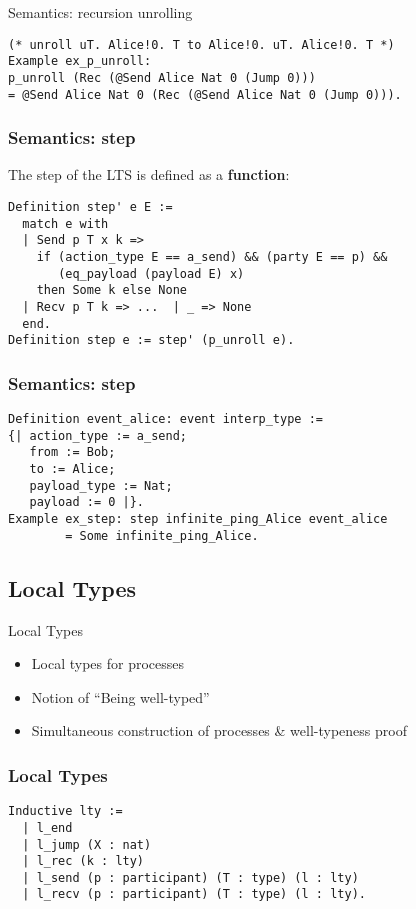 \begin{frame}[fragile]{Semantics: recursion unrolling}
	\begin{verbatim}
(* unroll uT. Alice!0. T to Alice!0. uT. Alice!0. T *)
Example ex_p_unroll:
p_unroll (Rec (@Send Alice Nat 0 (Jump 0)))
= @Send Alice Nat 0 (Rec (@Send Alice Nat 0 (Jump 0))).
	\end{verbatim}
\end{frame}

\begin{frame}[fragile]
    \frametitle{Semantics: step}
The step of the LTS is defined as a \textbf{function}:
\vspace{.5cm}
    \begin{verbatim}
Definition step' e E :=
  match e with
  | Send p T x k =>
    if (action_type E == a_send) && (party E == p) &&
       (eq_payload (payload E) x)
    then Some k else None
  | Recv p T k => ...  | _ => None
  end.
Definition step e := step' (p_unroll e).
    \end{verbatim}
\end{frame}

\begin{frame}[fragile]
    \frametitle{Semantics: step}
	\begin{verbatim}
Definition event_alice: event interp_type := 
{| action_type := a_send;
   from := Bob;
   to := Alice;
   payload_type := Nat;
   payload := 0 |}.
Example ex_step: step infinite_ping_Alice event_alice
		= Some infinite_ping_Alice.
	\end{verbatim}
\end{frame}

\subsection{Local Types}
\begin{frame}{Local Types}
	\begin{itemize}
		\item Local types for processes
		\item Notion of ``Being well-typed''
		\item Simultaneous construction of processes \& well-typeness proof
	\end{itemize}
\end{frame}

\begin{frame}[fragile]
    \frametitle{Local Types}
    \begin{verbatim}
Inductive lty :=
  | l_end
  | l_jump (X : nat)
  | l_rec (k : lty)
  | l_send (p : participant) (T : type) (l : lty)
  | l_recv (p : participant) (T : type) (l : lty).
    \end{verbatim}
\end{frame}

